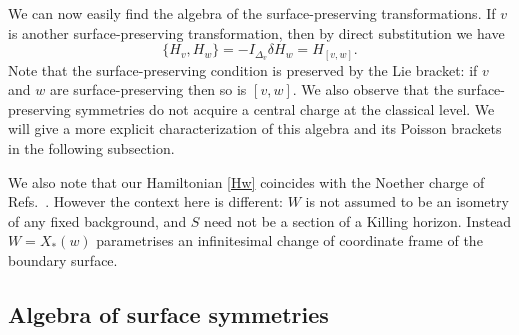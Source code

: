 \documentclass[a4paper,11pt]{article}
\begin{document}
We can now easily find the algebra of the surface-preserving transformations.
If $v$ is another surface-preserving transformation, then by direct substitution we have
\begin{equation} \label{HvHw}
\{ H_v, H_w \} = -I_{\Delta_v} \delta H_w = H_{[v,w]}.
\end{equation}
Note that the surface-preserving condition is preserved by the Lie bracket: if $v$ and $w$ are surface-preserving then so is $[v,w]$.
We also observe that the surface-preserving symmetries do not acquire a central charge at the classical level.
We will give a more explicit characterization of this algebra and its Poisson brackets in the following subsection.

We also note that our Hamiltonian \eqref{Hw} coincides with the Noether charge of Refs.~\cite{Wald1993,Iyer1994}.
However the context here is different: $W$ is not assumed to be an isometry of any fixed background, and $S$ need not be a section of a Killing horizon. 
Instead $W=X_*(w)$ parametrises an infinitesimal change of coordinate frame of the boundary surface.

\subsection{Algebra of surface symmetries} \label{section:twoplustwo}
\end{document}
